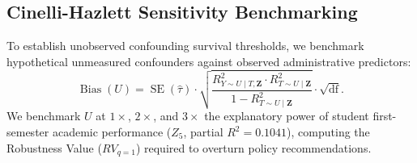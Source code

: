 \subsection{Cinelli-Hazlett Sensitivity Benchmarking}

To establish unobserved confounding survival thresholds, we benchmark hypothetical unmeasured confounders against observed administrative predictors:
\begin{equation}
    \operatorname{Bias}(U) = \operatorname{SE}(\hat{\tau}) \cdot \sqrt{\frac{R^2_{Y \sim U \mid T, \mathbf{Z}} \cdot R^2_{T \sim U \mid \mathbf{Z}}}{1 - R^2_{T \sim U \mid \mathbf{Z}}}} \cdot \sqrt{\text{df}}.
    \label{eq:cinelli_bias_eval}
\end{equation}
We benchmark $U$ at $1\times$, $2\times$, and $3\times$ the explanatory power of student first-semester academic performance ($Z_5$, partial $R^2 = 0.1041$), computing the Robustness Value ($RV_{q=1}$) required to overturn policy recommendations.
